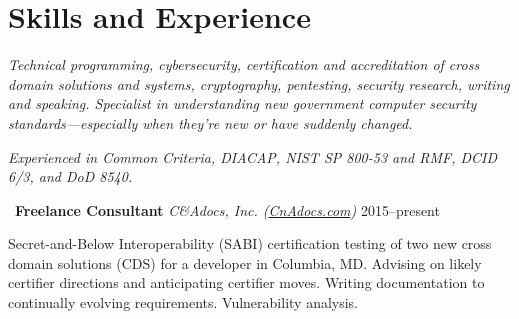 \section*{Skills and Experience}

\vspace{-2mm}
\emph{Technical programming, cybersecurity, certification and accreditation
of cross domain solutions and systems, cryptography, pentesting, security
research, writing and speaking. Specialist in understanding new government
computer security standards---especially when they're new or have
suddenly changed.}

\vspace{2mm}
\noindent\emph{Experienced in Common Criteria, DIACAP, NIST SP 800-53
and RMF, DCID 6/3, and DoD 8540.}

\begin{comment}
\vspace{-2mm}
\begin{tabular*}{\textwidth}{ll}
    \hline
    \rule{0pt}{5mm}Cybersecurity Regulations & Specialist in understanding
        new government security standards, \\
        & especially when these are unfamiliar or have suddenly changed.
            \vspace{1.5mm} \\

    Technical Background & C and UNIX---including multi-level (CMW) programming and \\
        & security policies for Trusted Solaris, FreeBSD, or Linux. \vspace{1.5mm} \\

    \rule[-2mm]{0pt}{1em}All Current Standards & Common Criteria,
        DIACAP, NIST SP 800-53 security controls, \\
        & \rule[-3mm]{0pt}{0pt}DCID 6/3, and the new Risk Management Framework (RMF). \\

    \hline
\end{tabular*}
\end{comment}

\vspace{2mm}
\noindent\textbullet\ \textbf{Freelance Consultant}
    \hfill \emph{C\&Adocs, Inc. (\url{CnAdocs.com})} \hfill 2015--present

    \vspace{1mm}
    \noindent Secret-and-Below Interoperability (SABI) certification
    testing of two new cross domain solutions (CDS) for a developer in
    Columbia, MD. Advising on likely certifier directions and anticipating
    certifier moves. Writing documentation to continually evolving
    requirements. Vulnerability analysis.

